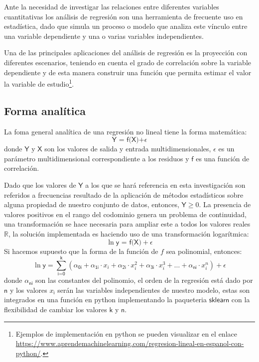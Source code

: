 Ante la necesidad de investigar las relaciones entre diferentes variables cuantitativas los análisis de regresión son una herramienta de frecuente uso en estadística, dado que simula un proceso o modelo que analiza este vínculo entre una variable dependiente y una o varias variables independientes. 

Una de las principales aplicaciones del análisis de regresión es la proyección con diferentes escenarios, teniendo en cuenta el grado de correlación sobre la variable dependiente y de esta manera construir una función que permita estimar el valor la variable de estudio\footnote{Ejemplos de implementación en python se pueden visualizar en el enlace \href{https://www.aprendemachinelearning.com/regresion-lineal-en-espanol-con-python/}{https://www.\-apren\-de\-machine\-learning\-.com/\-re\-gre\-si\-on-\-li\-neal-en-\-es\-pa\-nol-\-con-\-py\-thon/}.}. 

\subsection{Forma analítica}
La foma general analítica de una regresión no lineal tiene la forma matemática:
\begin{equation}
\textsf{Y = f(X)+}\epsilon
\end{equation}
donde $\textsf{Y}$ y $\textsf{X}$ son los valores de salida y entrada multidimensionales, $\epsilon$ es un parámetro multidimensional correspondiente a los residuos y $\textsf{f}$ es una función de correlación.

Dado que los valores de $\textsf{Y}$ a los que se hará referencia en esta investigación son referidos a frecuencias resultado de la aplicación de métodos estadísticos sobre alguna propiedad de nuestro conjunto de datos, entonces, $\textsf{Y} \geqslant 0$. La presencia de valores positivos en el rango del codominio genera un problema de continuidad, una transformación se hace necesaria para ampliar este a todos los valores reales $\mathbb{R}$, la solución implementada es haciendo uso de una transformación logarítmica:
\begin{equation}
\ln \textsf{y = f(X)}+\epsilon
\end{equation}
Si hacemos supuesto que la forma de la función de $f$ sea polinomial, entonces:
\begin{equation}\label{regresion}
\ln \textsf{y} = \sum_\textsf{i=0}^\textsf{k} (\alpha_\textsf{0i} + \alpha_\textsf{1i}\cdot x_i + \alpha_\textsf{2i}\cdot x_i^2 + \alpha_\textsf{3i}\cdot x_i^3 + \ldots+\alpha_\textsf{ni} \cdot x_i^n)+\epsilon
\end{equation}
donde $\alpha_\textsf{ni}$ son las constantes del polinomio, el orden de la regresión está dado por $\textsf{n}$ y los valores $x_\textsf{i}$ serán las variables independientes de nuestro modelo, estas son integrados en una función en python implementando la paqueteria $\textsf{sklearn}$ con la flexibilidad de cambiar los valores $\textsf{k}$ y $\textsf{n}$. %


